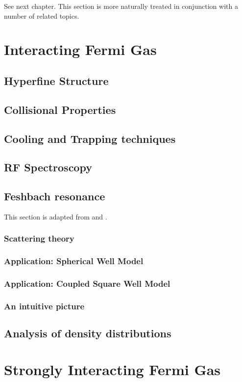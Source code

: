 \documentclass{book}
\theoremstyle{definition}
\begin{document}
See next chapter. This section is more naturally treated in conjunction with a number of related topics.


\chapter{Interacting Fermi Gas}


\section{Hyperfine Structure}

\section{Collisional Properties}


\section{Cooling and Trapping techniques}


\section{RF Spectroscopy}


\section{Feshbach resonance}

This section is adapted from \cite{campbellfeshbach} and \cite{ketterle2008making}.


\subsection{Scattering theory}

\subsection{Application: Spherical Well Model}

\subsection{Application: Coupled Square Well Model}

\subsection{An intuitive picture}




\section{Analysis of density distributions}













\chapter{Strongly Interacting Fermi Gas}


 




	
	
\end{document}
